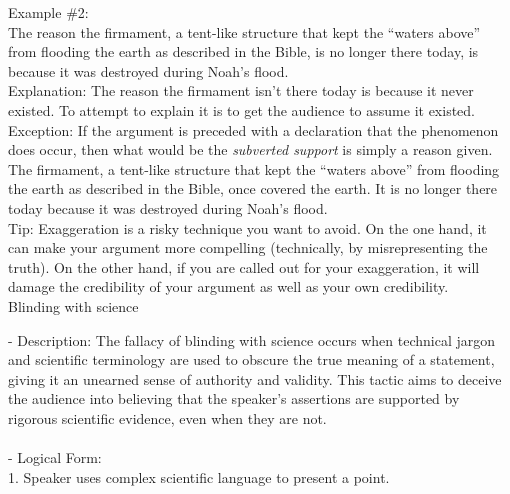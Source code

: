 \documentclass[a4paper,12pt,single,pdftex]{scrbook}
\begin{document}
    
      Example \#2:
    \\

    
      The reason the firmament, a tent-like structure that kept the “waters above” from flooding the earth as described in the Bible, is no longer there today, is because it was destroyed during Noah’s flood.
    \\

    
      Explanation: The reason the firmament isn’t there today is because it never existed.  To attempt to explain it is to get the audience to assume it existed.
    \\

    
      Exception: If the argument is preceded with a declaration that the phenomenon does occur, then what would be the {\it subverted support }is simply a reason given.
    \\

    
      The firmament, a tent-like structure that kept the “waters above” from flooding the earth as described in the Bible, once covered the earth.  It is no longer there today because it was destroyed during Noah’s flood.
    \\

    
      Tip: Exaggeration is a risky technique you want to avoid. On the one hand, it can make your argument more compelling (technically, by misrepresenting the truth). On the other hand, if you are called out for your exaggeration, it will damage the credibility of your argument as well as your own credibility.
    \\

  

Blinding with science
    
      - Description: The fallacy of blinding with science occurs when technical jargon and scientific terminology are used to obscure the true meaning of a statement, giving it an unearned sense of authority and validity. This tactic aims to deceive the audience into believing that the speaker’s assertions are supported by rigorous scientific evidence, even when they are not.
    \\

    
      
    \\

    
      - Logical Form:
    \\

    
        1. Speaker uses complex scientific language to present a point.
    \\
\end{document}
